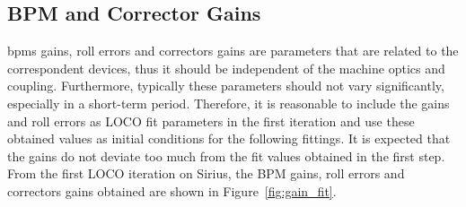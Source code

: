 \subsection{BPM and Corrector Gains}
\glspl{bpm} gains, roll errors and correctors gains are parameters that are related to the correspondent devices, thus it should be independent of the machine optics and coupling. Furthermore, typically these parameters should not vary significantly, especially in a short-term period. Therefore, it is reasonable to include the gains and roll errors as LOCO fit parameters in the first iteration and use these obtained values as initial conditions for the following fittings. It is expected that the gains do not deviate too much from the fit values obtained in the first step. From the first LOCO iteration on Sirius, the BPM gains, roll errors and correctors gains obtained are shown in Figure~\ref{fig:gain_fit}.
